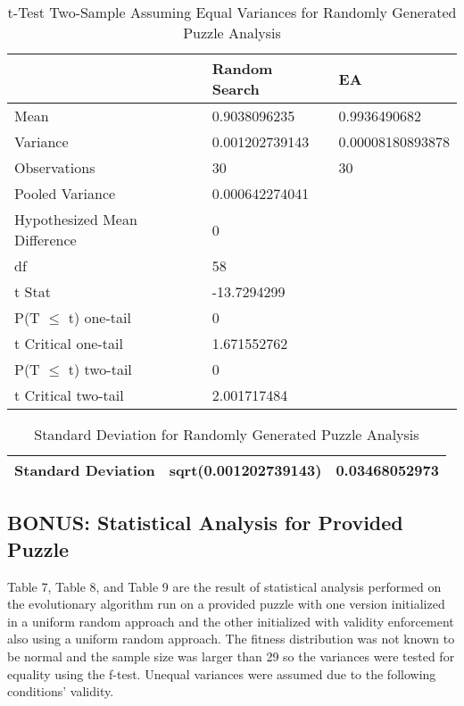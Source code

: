 \documentclass[11pt]{article}
\begin{document}
\begin{table}[H]
\centering
\caption{t-Test Two-Sample Assuming Equal Variances for Randomly Generated Puzzle Analysis}
\label{my-label}
\begin{tabular}{l|l|l}
 & Random Search & EA \\ \hline
Mean & 0.9038096235 & 0.9936490682 \\
Variance & 0.001202739143 & 0.00008180893878 \\
Observations & 30 & 30 \\
Pooled Variance & 0.000642274041 &  \\
Hypothesized Mean Difference & 0 &  \\
df & 58 &  \\
t Stat & -13.7294299 &  \\
P(T $\leq$ t) one-tail & 0 &  \\
t Critical one-tail & 1.671552762 &  \\
P(T $\leq$ t) two-tail & 0 &  \\
t Critical two-tail & 2.001717484 &
\end{tabular}
\end{table}

\begin{table}[H]
\centering
\caption{Standard Deviation for Randomly Generated Puzzle Analysis}
\label{my-label}
\begin{tabular}{|l|l|l|}
\hline
Standard Deviation & sqrt(0.001202739143) & 0.03468052973 \\ \hline
\end{tabular}
\end{table}





\subsection{BONUS: Statistical Analysis for Provided Puzzle}

Table 7, Table 8, and Table 9 are the result of statistical analysis performed on the 
evolutionary algorithm run on a provided puzzle with one version initialized in a 
uniform random approach and the other initialized with validity enforcement also using 
a uniform random approach. The fitness distribution was not known to be normal 
and the sample size was larger than 29 so the variances were tested for 
equality using the f-test. Unequal variances were assumed due to the following 
conditions' validity.
\end{document}
